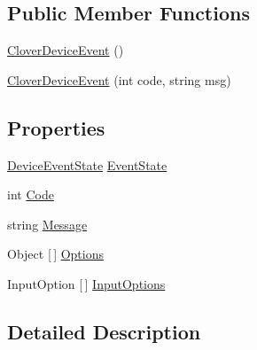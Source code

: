 \subsection*{Public Member Functions}
\begin{DoxyCompactItemize}
\item 
\hyperlink{classcom_1_1clover_1_1remotepay_1_1sdk_1_1_clover_device_event_a0df5d9dce784a5f5f5a89b4d52e2d307}{Clover\+Device\+Event} ()
\item 
\hyperlink{classcom_1_1clover_1_1remotepay_1_1sdk_1_1_clover_device_event_a7533454f372bda7cca419525f8fd7133}{Clover\+Device\+Event} (int code, string msg)
\end{DoxyCompactItemize}
\subsection*{Properties}
\begin{DoxyCompactItemize}
\item 
\hyperlink{classcom_1_1clover_1_1remotepay_1_1sdk_1_1_clover_device_event_a1c3d109490aaab4a0b8f40ceb990abe3}{Device\+Event\+State} \hyperlink{classcom_1_1clover_1_1remotepay_1_1sdk_1_1_clover_device_event_a5d6c86f9855c46c813acd9563f9c99ab}{Event\+State}
\item 
int \hyperlink{classcom_1_1clover_1_1remotepay_1_1sdk_1_1_clover_device_event_ae3422a3a9dcd7e8c1c7b20c410b24d9f}{Code}
\item 
string \hyperlink{classcom_1_1clover_1_1remotepay_1_1sdk_1_1_clover_device_event_aec34f3a982ec78a0a03499f1c309bde3}{Message}
\item 
Object \mbox{[}$\,$\mbox{]} \hyperlink{classcom_1_1clover_1_1remotepay_1_1sdk_1_1_clover_device_event_ae31e3c80cfdd87b897ba14d017a21599}{Options}
\item 
Input\+Option \mbox{[}$\,$\mbox{]} \hyperlink{classcom_1_1clover_1_1remotepay_1_1sdk_1_1_clover_device_event_aeeac7f67f737137d1b9ec633b7823d6a}{Input\+Options}
\end{DoxyCompactItemize}


\subsection{Detailed Description}


